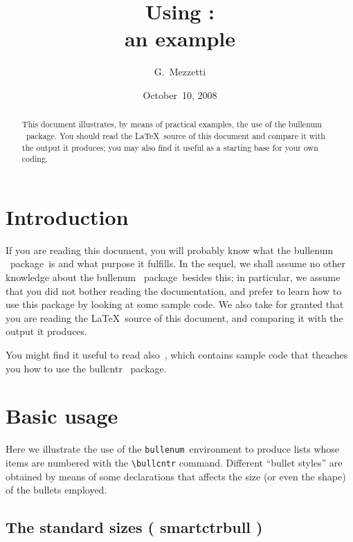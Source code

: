 \documentclass[a4paper]{article}
\title{Using \tbenu:\\an example}
\author{G.~Mezzetti}
\date{October~10, 2008}
\DeclareRobustCommand*{\command}[1]{%
	{\texorpdfstring{\normalfont\ttfamily \char\escapechar}{\pdfbslash}#1}%
}
\DeclareRobustCommand*{\packlass}[1]{%
	{\texorpdfstring{\normalfont \sffamily}{}#1}%
}
\DeclareRobustCommand*{\env}[1]{\texttt{#1}}
\newcommand*{\Bullcntr}{bullcntr}
\newcommand*{\bull}{\packlass{\Bullcntr}}
\newcommand*{\tbull}{the \bull\ package}
\newcommand*{\Bullenum}{bullenum}
\newcommand*{\benu}{\packlass{\Bullenum}}
\newcommand*{\tbenu}{the \benu\ package}
\newcommand*{\beenv}{\env{\Bullenum}}
\newcommand*{\pdfbslash}{}
{\catcode`\|=0 |catcode`|\=12 |gdef|pdfbslash{\\}}
\begin{document}
\maketitle

\begin{abstract}
	This document illustrates, by means of practical examples, the use
	of \tbenu.  You should read the \LaTeX\ source of this document
	and compare it with the output it produces; you may also find it
	useful as a starting base for your own coding.
\end{abstract}

\tableofcontents



\setcounter{secnumdepth}{0}

\section{Introduction}

If you are reading this document, you will probably know what \tbenu\
is and what purpose it fulfills.  In the sequel, we shall assume no
other knowledge about \tbenu\ besides this; in particular, we assume
that you did not bother reading the documentation, and prefer to learn
how to use this package by looking at some sample code.  We also take
for granted that you are reading the \LaTeX\ source of this document,
and comparing it with the output it produces.

You might find it useful to read also~\cite{bull-sam}, which contains
sample code that theaches you how to use \tbull.



\setcounter{secnumdepth}{3}

\section{Basic usage}

Here we illustrate the use of the \beenv\ environment to produce lists
whose items are numbered with the \verb|\bullcntr| command.  Different
``bullet styles'' are obtained by means of some declarations that
affects the size (or even the shape) of the bullets employed.



\subsection{The standard sizes (\command{smartctrbull})}
\label{SS:Xmp-Standard}
\end{document}
